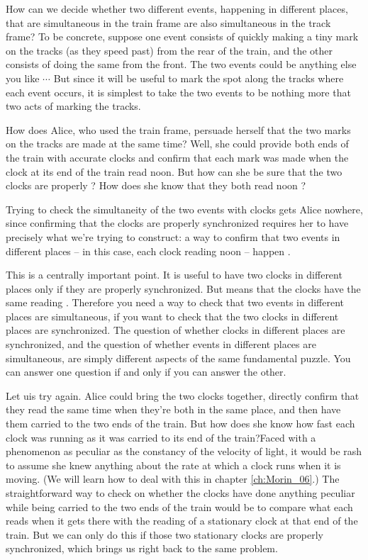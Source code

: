 How can we decide whether two different events, happening in different places, that are simultaneous in the train frame are also simultaneous in the track frame? To be concrete, suppose one event consists of quickly making a tiny mark on the tracks (as they speed past) from the rear of the train, and the other consists of doing the same from the front. The two events could be anything else you like $\cdots$ But since it will be useful to mark the spot along the tracks where each event occurs, it is simplest to take the two events to be nothing more that two acts of marking the tracks.

How does Alice, who used the train frame, persuade herself that the two marks on the tracks are made at the same time? Well, she could provide both ends of the train with accurate clocks and confirm that each mark was made when the clock at its end of the train read noon. But how can she be sure that the two clocks are properly ? How does she know that they both read noon ?

Trying to check the simultaneity of the two events with clocks gets Alice nowhere, since confirming that the clocks are properly synchronized requires her to have precisely what we're trying to construct: a way to confirm that two events in different places  -- in this case, each clock reading noon -- happen .

This is a centrally important point. It is useful to have two clocks in different places only if they are properly synchronized. But  means that the clocks have the same reading . Therefore you need a way to check that two events in different places are simultaneous, if you want to check that the two clocks in different places are synchronized. The question of whether clocks in different places are synchronized, and the question of whether events in different places are simultaneous, are simply different aspects of the same fundamental puzzle. You can answer one question if and only if you can answer the other.

Let uis try again. Alice could bring the two clocks together, directly confirm that they read the same time when they're both in the same place, and then have them carried to the two ends of the train. But how does she know how fast each clock was running as it was carried to its end of the train?Faced with a phenomenon as peculiar as the constancy of the velocity of light, it would be rash to assume she knew anything about the rate at which a clock runs when it is moving. (We will learn how to deal with this in chapter \ref{ch:Morin_06}.) The straightforward way to check on whether the clocks have done anything peculiar while being carried to the two ends of the train would be to compare what each reads when it gets there with the reading of a stationary clock at that end of the train. But we can only do this if those two stationary clocks are properly synchronized, which brings us right back to the same problem.

